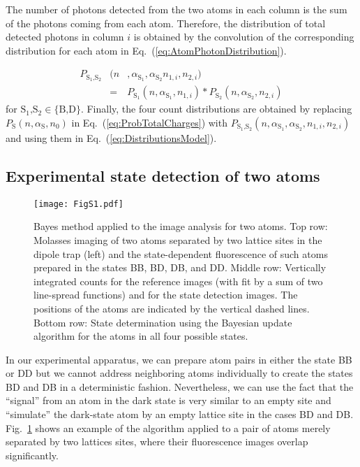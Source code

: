 \documentclass[aps,prl,twocolumn,english,showpacs]{revtex4-1}
\begin{document}
The number of photons detected from the two atoms in each column is the sum of the photons coming from each atom. Therefore, the distribution of total detected photons in column $i$ is obtained by the convolution of the corresponding distribution for each atom in Eq.~(\ref{eq:AtomPhotonDistribution}).


\begin{eqnarray} \label{eq:TwoAtomPotonDist}
P_{\text{S$_1$,S$_2$}}&(n&,\alpha_{\text{S$_1$}},\alpha_{\text{S$_2$}}n_{1,i},n_{2,i})\nonumber \\
&=& P_{\text{S$_1$}}( n,\alpha_{\text{S$_1$}},n_{1,i}) *P_{\text{S$_2$}}( n,\alpha_{\text{S$_2$}},n_{2,i})
\end{eqnarray}
for  $\text{S$_1$,S$_2$}\in\{ \text{B,D}\} $. Finally, the four count distributions are obtained by replacing $P_{\text{S}}\left( n,\alpha_{\text{S}}, n_{0} \right)$ in Eq.~(\ref{eq:ProbTotalCharges}) with $P_{\text{S$_1$,S$_2$}}(n,\alpha_{\text{S$_1$}},\alpha_{\text{S$_2$}},n_{1,i},n_{2,i})$ and using them in Eq.~(\ref{eq:DistributionsModel}).

\subsection{Experimental state detection of two atoms}

\begin{figure}[t]
\centering
    \texttt{[image: FigS1.pdf]}
  	\caption[Setup] {Bayes method applied to the image analysis for two atoms. Top row: Molasses imaging of two atoms separated by two lattice sites in the dipole trap (left) and the state-dependent fluorescence of such atoms prepared in the states BB, BD, DB, and DD.  Middle row: Vertically integrated counts for the reference images (with fit by a sum of two line-spread functions) and for the state detection images. The positions of the atoms are indicated by the vertical dashed lines. Bottom row: State determination using the Bayesian update algorithm for the atoms in all four possible states.} {\label{fig:fig6}}
\end{figure}

In our experimental apparatus, we can prepare atom pairs in either the state BB or DD but we cannot address neighboring atoms individually to create the states BD and DB in a deterministic fashion. Nevertheless, we can use the fact that the ``signal'' from an atom in the dark state is very similar to an empty site and ``simulate'' the dark-state atom by an empty lattice site in the cases BD and DB. Fig.~\ref{fig:fig6} shows an example of the algorithm applied to a pair of atoms merely separated by two lattices sites, where their fluorescence images overlap significantly. 
\end{document}
